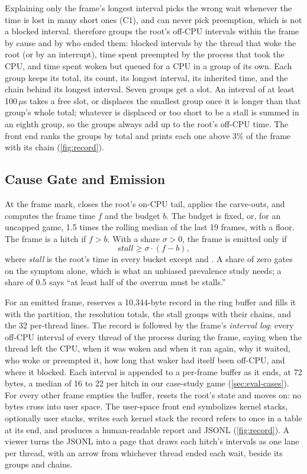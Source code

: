 Explaining only the frame's longest interval picks the wrong wait whenever
the time is lost in many short ones (C1), and can never pick preemption,
which is not a blocked interval. \sys therefore groups the root's off-CPU
intervals within the frame by cause and by who ended them: blocked intervals
by the thread that woke the root (or by an interrupt), time spent preempted
by the process that took the CPU, and time spent woken but queued for a CPU
in a group of its own. Each group keeps its total, its count, its longest
interval, its inherited time, and the chain behind its longest interval.
Seven groups get a slot. An interval of at least 100\,$\mu$s takes a free
slot, or displaces the smallest group once it is longer than that group's
whole total; whatever is displaced or too short to be a stall is summed in
an eighth group, so the groups always add up to the root's off-CPU time.
The front end ranks the groups by total and prints each one above 3\% of
the frame with its chain (\autoref{fig:record}).

\subsection{Cause Gate and Emission}
\label{sec:gate}

At the frame mark, \sys closes the root's on-CPU tail, applies the
carve-outs, and computes the frame time $f$ and the budget $b$. The budget is
fixed, or, for an uncapped game, 1.5 times the rolling median of the last 19
frames, with a floor. The frame is a hitch if $f > b$. With a share $\sigma
> 0$, the frame is emitted only if
\[
\textit{stall} \geq \sigma \cdot (f - b),
\]
where \textit{stall} is the root's time in every bucket except
 and . A share of zero gates on the
symptom alone, which is what an unbiased prevalence study needs; a share of
0.5 says ``at least half of the overrun must be stalls.''

For an emitted frame, \sys reserves a 10,344-byte record in the ring buffer
and fills it with the partition, the resolution totals, the stall groups
with their chains, and the 32 per-thread lines. The record is followed by
the frame's \emph{interval log}: every off-CPU interval of every thread of
the process during the frame, saying when the thread left the CPU, when it
was woken and when it ran again, why it waited, who woke or preempted it,
how long that waker had itself been off-CPU, and where it blocked. Each
interval is appended to a per-frame buffer as it ends, at 72 bytes, a median
of 16 to 22 per hitch in our case-study game (\autoref{sec:eval-cases}). For
every other frame \sys empties the buffer, resets the root's state and moves
on: no bytes cross into user space. The user-space front end symbolizes
kernel stacks, optionally user stacks, writes each kernel stack the record
refers to once in a table at its end, and produces a human-readable report
and JSONL (\autoref{fig:record}). A viewer turns the JSONL into a page
that draws each hitch's intervals as one lane per thread, with an arrow from
whichever thread ended each wait, beside its groups and chains.

